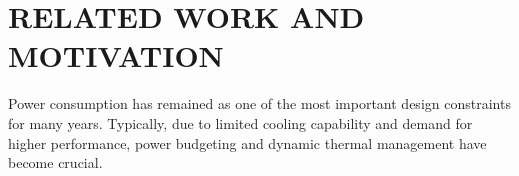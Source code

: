 \section{RELATED WORK AND MOTIVATION}
\label{sec:related_works}




Power consumption has remained as one of the most important design constraints for many years. Typically, due to limited cooling capability and demand for higher performance, power budgeting and dynamic thermal management have become crucial.

